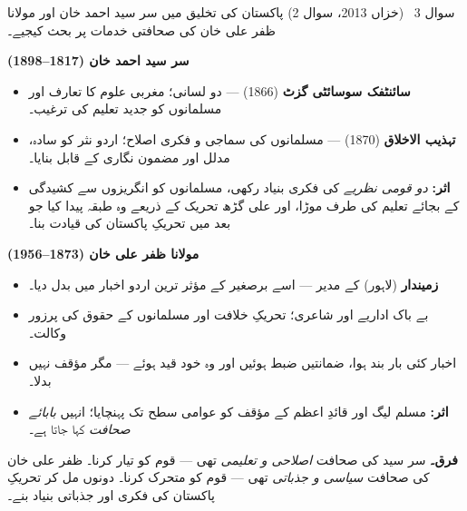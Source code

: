 \begin{hal}
\end{hal}

\begin{sawal}{سوال \textenglish{3} \ \textnormal{\small(خزاں \textenglish{2013}، سوال \textenglish{2})}}
پاکستان کی تخلیق میں سر سید احمد خان اور مولانا ظفر علی خان کی صحافتی خدمات پر
بحث کیجیے۔
\end{sawal}

\begin{hal}
\textbf{سر سید احمد خان (\textenglish{1817--1898})}
\begin{itemize}\setlength{\itemsep}{1pt}
  \item \textbf{سائنٹفک سوسائٹی گزٹ} (\textenglish{1866}) --- دو لسانی؛ مغربی
        علوم کا تعارف اور مسلمانوں کو جدید تعلیم کی ترغیب۔
  \item \textbf{تہذیب الاخلاق} (\textenglish{1870}) --- مسلمانوں کی سماجی و
        فکری اصلاح؛ اردو نثر کو سادہ، مدلل اور مضمون نگاری کے قابل بنایا۔
  \item \textbf{اثر:} \emph{دو قومی نظریے} کی فکری بنیاد رکھی، مسلمانوں کو
        انگریزوں سے کشیدگی کے بجائے تعلیم کی طرف موڑا، اور علی گڑھ تحریک کے
        ذریعے وہ طبقہ پیدا کیا جو بعد میں تحریکِ پاکستان کی قیادت بنا۔
\end{itemize}

\textbf{مولانا ظفر علی خان (\textenglish{1873--1956})}
\begin{itemize}\setlength{\itemsep}{1pt}
  \item \textbf{زمیندار} (لاہور) کے مدیر --- اسے برصغیر کے مؤثر ترین اردو
        اخبار میں بدل دیا۔
  \item بے باک اداریے اور شاعری؛ تحریکِ خلافت اور مسلمانوں کے حقوق کی
        پرزور وکالت۔
  \item اخبار کئی بار بند ہوا، ضمانتیں ضبط ہوئیں اور وہ خود قید ہوئے --- مگر
        مؤقف نہیں بدلا۔
  \item \textbf{اثر:} مسلم لیگ اور قائدِ اعظم کے مؤقف کو عوامی سطح تک پہنچایا؛
        انہیں \emph{بابائے صحافت} کہا جاتا ہے۔
\end{itemize}

\medskip
\textbf{فرق۔} سر سید کی صحافت \emph{اصلاحی و تعلیمی} تھی --- قوم کو تیار کرنا۔
ظفر علی خان کی صحافت \emph{سیاسی و جذباتی} تھی --- قوم کو متحرک کرنا۔ دونوں
مل کر تحریکِ پاکستان کی فکری اور جذباتی بنیاد بنے۔

\end{hal}

